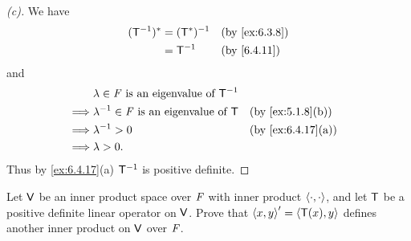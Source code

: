 \begin{proof}[(c)]
	We have
	\begin{align*}
		(\T^{-1})^* & = (\T^*)^{-1} &  & \by{ex:6.3.8} \\
		            & = \T^{-1}     &  & \by{6.4.11}
	\end{align*}
	and
	\begin{align*}
		         & \lambda \in \F \text{ is an eigenvalue of } \T^{-1}                        \\
		\implies & \lambda^{-1} \in \F \text{ is an eigenvalue of } \T &  & \by{ex:5.1.8}[b]  \\
		\implies & \lambda^{-1} > 0                                    &  & \by{ex:6.4.17}[a] \\
		\implies & \lambda > 0.
	\end{align*}
	Thus by \cref{ex:6.4.17}(a) \(\mathsf{T}^{-1}\) is positive definite.
\end{proof}

\begin{ex}\label{ex:6.4.20}
	Let \(\mathsf{V}\) be an inner product space over \(\mathit{F}\) with inner product \(\left\langle\cdot, \cdot\right\rangle\), and let \(\mathsf{T}\) be a positive definite linear operator on \(\mathsf{V}\).
	Prove that \(\left\langle x, y\right\rangle' = \left\langle\mathsf{T}(x), y\right\rangle\) defines another inner product on \(\mathsf{V}\) over \(\mathit{F}\).
\end{ex}

